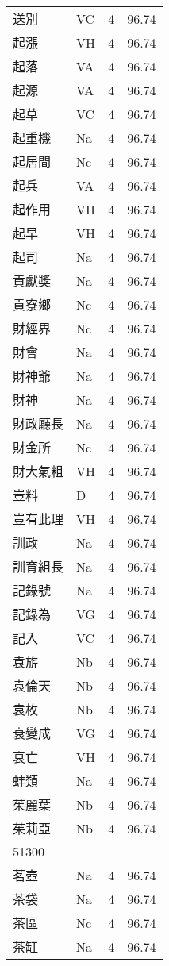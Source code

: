 \documentclass[twocolumn]{book}
\begin{document}
\begin{supertabular}{llrr}
送別 & VC & 4 &  96.74\\
起漲 & VH & 4 &  96.74\\
起落 & VA & 4 &  96.74\\
起源 & VA & 4 &  96.74\\
起草 & VC & 4 &  96.74\\
起重機 & Na & 4 &  96.74\\
起居間 & Nc & 4 &  96.74\\
起兵 & VA & 4 &  96.74\\
起作用 & VH & 4 &  96.74\\
起早 & VH & 4 &  96.74\\
起司 & Na & 4 &  96.74\\
貢獻獎 & Na & 4 &  96.74\\
貢寮鄉 & Nc & 4 &  96.74\\
財經界 & Nc & 4 &  96.74\\
財會 & Na & 4 &  96.74\\
財神爺 & Na & 4 &  96.74\\
財神 & Na & 4 &  96.74\\
財政廳長 & Na & 4 &  96.74\\
財金所 & Nc & 4 &  96.74\\
財大氣粗 & VH & 4 &  96.74\\
豈料 & D & 4 &  96.74\\
豈有此理 & VH & 4 &  96.74\\
訓政 & Na & 4 &  96.74\\
訓育組長 & Na & 4 &  96.74\\
記錄號 & Na & 4 &  96.74\\
記錄為 & VG & 4 &  96.74\\
記入 & VC & 4 &  96.74\\
袁旂 & Nb & 4 &  96.74\\
袁倫天 & Nb & 4 &  96.74\\
袁枚 & Nb & 4 &  96.74\\
衰變成 & VG & 4 &  96.74\\
衰亡 & VH & 4 &  96.74\\
蚌類 & Na & 4 &  96.74\\
茱麗葉 & Nb & 4 &  96.74\\
茱莉亞 & Nb & 4 &  96.74\\
51300\\
茗壺 & Na & 4 &  96.74\\
茶袋 & Na & 4 &  96.74\\
茶區 & Nc & 4 &  96.74\\
茶缸 & Na & 4 &  96.74\\

\end{supertabular}
\end{document}
